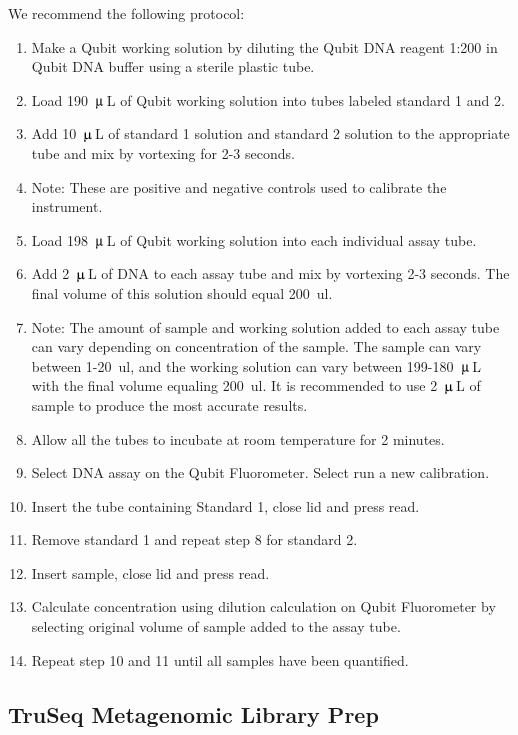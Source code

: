\documentclass[graybox]{svmult}
\begin{document}
We recommend the following protocol:
\begin{enumerate}
\item{     Make a Qubit working solution by diluting the Qubit DNA reagent 1:200 in Qubit DNA buffer using a sterile plastic tube.}
\item{       Load 190~$\umu$\,L of Qubit working solution into tubes labeled standard 1 and 2.}
\item{       Add 10~$\umu$\,L of standard 1 solution and standard 2 solution to the appropriate tube and mix by vortexing for 2-3 seconds.}
\item{         Note: These are positive and negative controls used to calibrate the instrument.}
\item{       Load 198~$\umu$\,L of Qubit working solution into each individual assay tube.}
\item{       Add 2~$\umu$\,L of DNA to each assay tube and mix by vortexing 2-3 seconds. The final volume of this solution should equal 200~ul.}
\item{        Note: The amount of sample and working solution added to each assay tube can vary depending on concentration of the sample. The sample can vary between 1-20~ul, and the working solution can vary between 199-180~$\umu$\,L with the final volume equaling 200~ul. It is recommended to use 2~$\umu$\,L of sample to produce the most accurate results.}
\item{       Allow all the tubes to incubate at room temperature for 2 minutes.}
\item{       Select DNA assay on the Qubit Fluorometer. Select run a new calibration.}
\item{       Insert the tube containing Standard 1, close lid and press read.}
\item{       Remove standard 1 and repeat step 8 for standard 2.}
\item{      Insert sample, close lid and press read.}
\item{      Calculate concentration using dilution calculation on Qubit Fluorometer by selecting original volume of sample added to the assay tube.}
\item{      Repeat step 10 and 11 until all samples have been quantified.}
\end{enumerate}

\subsection{TruSeq Metagenomic Library Prep}
\end{document}

